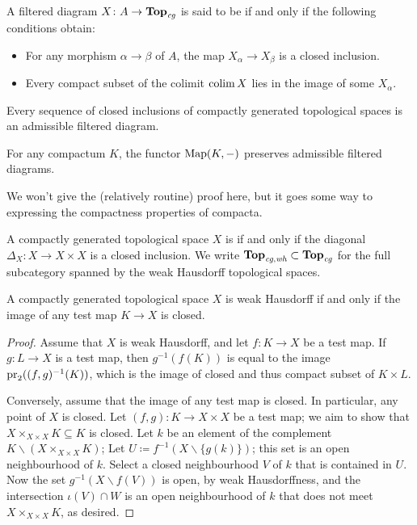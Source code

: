 \begin{dfn}
	A filtered diagram $ X \colon A \to \textbf{\textup{Top}}_{\textit{cg}} $ is said to be  if and only if the following conditions obtain:
	\begin{itemize}
		\item For any morphism $ \alpha \to \beta $ of $ A $, the map $ X_{\alpha} \to X_{\beta} $ is a closed inclusion.
		\item Every compact subset of the colimit $ \operatorname*{colim} X $ lies in the image of some $ X_{\alpha} $.
	\end{itemize}
\end{dfn}

\begin{exm}
	Every sequence of closed inclusions of compactly generated topological spaces is an admissible filtered diagram.
\end{exm}

\begin{lem}
	For any compactum $ K $, the functor $ \operatorname{Map}(K, -) $ preserves admissible filtered diagrams.
\end{lem}

We won't give the (relatively routine) proof here, but it goes some way to expressing the compactness properties of compacta.

\begin{dfn}
	A compactly generated topological space $ X $ is  if and only if the diagonal $ \Delta_X \colon X \to X \times X $ is a closed inclusion.
	We write $ \textbf{\textup{Top}}_{\textit{cg}, \textit{wh}} \subset \textbf{\textup{Top}}_{\textit{cg}} $ for the full subcategory spanned by the weak Hausdorff topological spaces.
\end{dfn}

\begin{lem}
	A compactly generated topological space $ X $ is weak Hausdorff if and only if the image of any test map $ K \to X $ is closed.
\end{lem}

\begin{proof}
	Assume that $ X $ is weak Hausdorff, and let $ f \colon K \to X $ be a test map.
	If $ g \colon L \to X $ is a test map, then $ g^{-1}(f(K)) $ is equal to the image $ \operatorname{pr}_2((f, g)^{-1}(K)) $, which is the image of closed and thus compact subset of $ K \times L $.

	Conversely, assume that the image of any test map is closed.
	In particular, any point of $ X $ is closed.
	Let $ (f, g) \colon K \to X \times X $ be a test map;
	we aim to show that $ X \times_{X \times X} K \subseteq K $ is closed.
	Let $ k $ be an element of the complement $ K \smallsetminus ( X \times_{X \times X} K ) $;
	Let $ U \coloneq f^{-1}( X \smallsetminus \{ g(k) \} ) $;
	this set is an open neighbourhood of $ k $.
	Select a closed neighbourhood $ V $ of $ k $ that is contained in $ U $.
	Now the set $ g^{-1}(X \smallsetminus f(V)) $ is open, by weak Hausdorffness, and the intersection $ \iota(V) \cap W $ is an open neighbourhood of $ k $ that does not meet $ X \times_{X \times X} K $, as desired.
\end{proof}


